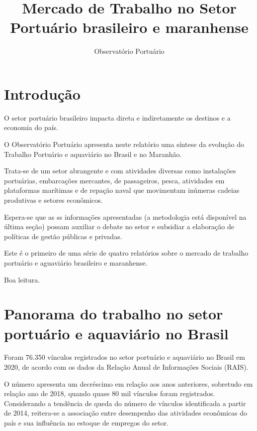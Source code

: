 \documentclass[
]{article}
\title{Mercado de Trabalho no Setor Portuário brasileiro e maranhense}
\author{Observatório Portuário}
\date{}
\begin{document}
\maketitle

{
\setcounter{tocdepth}{2}
\tableofcontents
}
\hypertarget{introduuxe7uxe3o}{%
\section{Introdução}\label{introduuxe7uxe3o}}

O setor portuário brasileiro impacta direta e indiretamente os destinos
e a economia do país.

O Observatório Portuário apresenta neste relatório uma síntese da
evolução do Trabalho Portuário e aquaviário no Brasil e no Maranhão.

Trata-se de um setor abrangente e com atividades diversas como
instalações portuárias, embarcações mercantes, de passageiros, pesca,
atividades em plataformas marítimas e de repação naval que movimentam
inúmeras cadeias produtivas e setores econômicos.

Espera-se que as ss informações apresentadas (a metodologia está
disponível na última seção) possam auxiliar o debate no setor e
subsidiar a elaboração de políticas de gestão públicas e privadas.

Este é o primeiro de uma série de quatro relatórios sobre o mercado de
trabalho portuário e aguaviário brasileiro e maranhense.

Boa leitura.

\hypertarget{panorama-do-trabalho-no-setor-portuuxe1rio-e-aquaviuxe1rio-no-brasil}{%
\section{Panorama do trabalho no setor portuário e aquaviário no
Brasil}\label{panorama-do-trabalho-no-setor-portuuxe1rio-e-aquaviuxe1rio-no-brasil}}

Foram 76.350 vínculos registrados no setor portuário e aquaviário no
Brasil em 2020, de acordo com os dados da Relação Anual de Informações
Sociais (RAIS).

O número apresenta um decréscimo em relação aos anos anteriores,
sobretudo em relação ano de 2018, quando quase 80 mil vínculos foram
registrados. Considerando a tendência de queda do número de vínculos
identificada a partir de 2014, reitera-se a associação entre desempenho
das atividades econômicas do país e sua influência no estoque de
empregos do setor.
\end{document}
